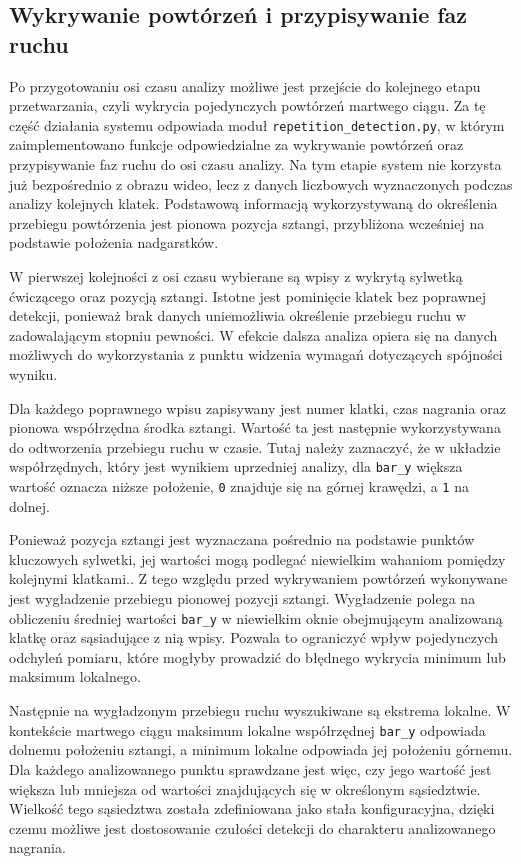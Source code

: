 \subsection{Wykrywanie powtórzeń i przypisywanie faz ruchu}

Po przygotowaniu osi czasu analizy możliwe jest przejście do kolejnego etapu przetwarzania, czyli wykrycia pojedynczych powtórzeń martwego ciągu. Za tę część działania systemu odpowiada moduł \texttt{repetition\_detection.py}, w którym zaimplementowano funkcje odpowiedzialne za wykrywanie powtórzeń oraz przypisywanie faz ruchu do osi czasu analizy. Na tym etapie system nie korzysta już bezpośrednio z obrazu wideo, lecz z danych liczbowych wyznaczonych podczas analizy kolejnych klatek. Podstawową informacją wykorzystywaną do określenia przebiegu powtórzenia jest pionowa pozycja sztangi, przybliżona wcześniej na podstawie położenia nadgarstków.

W pierwszej kolejności z osi czasu wybierane są wpisy z wykrytą sylwetką ćwiczącego oraz pozycją sztangi. Istotne jest pominięcie klatek bez poprawnej detekcji, ponieważ brak danych uniemożliwia określenie przebiegu ruchu w zadowalającym stopniu pewności. W efekcie dalsza analiza opiera się na danych możliwych do wykorzystania z punktu widzenia wymagań dotyczących spójności wyniku.

Dla każdego poprawnego wpisu zapisywany jest numer klatki, czas nagrania oraz pionowa współrzędna środka sztangi. Wartość ta jest następnie wykorzystywana do odtworzenia przebiegu ruchu w czasie. Tutaj należy zaznaczyć, że w układzie współrzędnych, który jest wynikiem uprzedniej analizy, dla \texttt{bar\_y} większa wartość oznacza niższe położenie, \texttt{0} znajduje się na górnej krawędzi, a \texttt{1} na dolnej.

Ponieważ pozycja sztangi jest wyznaczana pośrednio na podstawie punktów kluczowych sylwetki, jej wartości mogą podlegać niewielkim wahaniom pomiędzy kolejnymi klatkami\cite{wade2022markerless,mundt2024twodimensional}.. Z tego względu przed wykrywaniem powtórzeń wykonywane jest wygładzenie przebiegu pionowej pozycji sztangi. Wygładzenie polega na obliczeniu średniej wartości \texttt{bar\_y} w niewielkim oknie obejmującym analizowaną klatkę oraz sąsiadujące z nią wpisy. Pozwala to ograniczyć wpływ pojedynczych odchyleń pomiaru, które mogłyby prowadzić do błędnego wykrycia minimum lub maksimum lokalnego.

Następnie na wygładzonym przebiegu ruchu wyszukiwane są ekstrema lokalne. W kontekście martwego ciągu maksimum lokalne współrzędnej \texttt{bar\_y} odpowiada dolnemu położeniu sztangi, a minimum lokalne odpowiada jej położeniu górnemu. Dla każdego analizowanego punktu sprawdzane jest więc, czy jego wartość jest większa lub mniejsza od wartości znajdujących się w określonym sąsiedztwie. Wielkość tego sąsiedztwa została zdefiniowana jako stała konfiguracyjna, dzięki czemu możliwe jest dostosowanie czułości detekcji do charakteru analizowanego nagrania.

